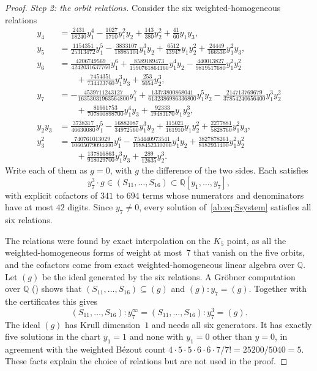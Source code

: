 \documentclass[a4paper,11pt]{article}
\newcommand{\filename}[1]{\texttt{\seqsplit{#1}}}
\theoremstyle{jsplain}
\theoremstyle{jsdef}
\theoremstyle{jsrem}
\begin{document}
\begin{proof}
\emph{Step 2: the orbit relations.} Consider the six weighted-homogeneous relations
\begin{align*}
y_4&=\tfrac{2431}{18240}y_1^4-\tfrac{1027}{1710}y_1^2y_2+\tfrac{143}{380}y_2^2+\tfrac{41}{60}y_1y_3,\\
y_5&=\tfrac{1154351}{25313472}y_1^5-\tfrac{3833107}{18985104}y_1^3y_2+\tfrac{6512}{43947}y_1y_2^2+\tfrac{24449}{166536}y_1^2y_3,\\
y_6&=\tfrac{4206749569}{4242031637760}y_1^6+\tfrac{8589189473}{1590761864160}y_1^4y_2-\tfrac{440013827}{9819517680}y_1^2y_2^2\\&\qquad+\tfrac{7454351}{734423760}y_1^3y_3+\tfrac{253}{5054}y_2^3,\\
y_7&=-\tfrac{4539711243127}{16353031963564800}y_1^7+\tfrac{13373800868041}{6132386986336800}y_1^5y_2-\tfrac{214713769679}{37854240656400}y_1^3y_2^2\\&\qquad+\tfrac{81661753}{707800898700}y_1^4y_3+\tfrac{92333}{19483170}y_1y_2^3,\\
y_2y_3&=\tfrac{3738317}{46630080}y_1^5-\tfrac{16882087}{34972560}y_1^3y_2+\tfrac{115021}{161910}y_1y_2^2+\tfrac{2277881}{5828760}y_1^2y_3,\\
y_3^2&=\tfrac{740761013029}{10605079094400}y_1^6-\tfrac{754440973541}{1988452330200}y_1^4y_2+\tfrac{3827878261}{8182931400}y_1^2y_2^2\\&\qquad+\tfrac{137816863}{918029700}y_1^3y_3+\tfrac{289}{12635}y_2^3 .
\end{align*}
Write each of them as $g=0$, with $g$ the difference of the two sides. Each satisfies
\[
y_7^3\cdot g\in(S_{11},\dots,S_{16})\subset\mathbb{Q}[y_1,\dots,y_7],
\]
with explicit cofactors of $341$ to $694$ terms whose numerators and denominators have at most $42$ digits. Since $y_7\neq0$, every solution of~\eqref{ab:eq:Ssystem} satisfies all six relations.

The relations were found by exact interpolation on the $K_5$ point, as all the weighted-homogeneous forms of weight at most~$7$ that vanish on the five orbits, and the cofactors come from exact weighted-homogeneous linear algebra over $\mathbb{Q}$. Let $(g)$ be the ideal generated by the six relations. A Gr\"obner computation over $\mathbb{Q}$ (\filename{saturation\_check.py}) shows that $(S_{11},\dots,S_{16})\subseteq(g)$ and $(g):y_7=(g)$. Together with the certificates this gives
\[
(S_{11},\dots,S_{16}):y_7^\infty=(S_{11},\dots,S_{16}):y_7^3=(g).
\]
The ideal $(g)$ has Krull dimension~$1$ and needs all six generators. It has exactly five solutions in the chart $y_1=1$ and none with $y_1=0$ other than $y=0$, in agreement with the weighted B\'ezout count $4\cdot5\cdot5\cdot6\cdot6\cdot7/7!=25200/5040=5$. These facts explain the choice of relations but are not used in the proof.


\end{proof}
\end{document}
